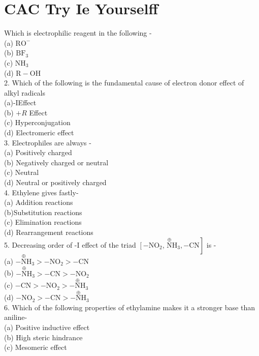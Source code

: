 \documentclass[10pt]{article}
\begin{document}
\section*{CAC Try Ie Yourselff}
Which is electrophilic reagent in the following -\\
(a) $\mathrm{RO}^{-}$\\
(b) $\mathrm{BF}_{3}$\\
(c) $\mathrm{NH}_{3}$\\
(d) $\mathrm{R}-\mathrm{OH}$\\
2. Which of the following is the fundamental cause of electron donor effect of alkyl radicals\\
(a)-IEffect\\
(b) $+R$ Effect\\
(c) Hyperconjugation\\
(d) Electromeric effect\\
3. Electrophiles are always -\\
(a) Positively charged\\
(b) Negatively charged or neutral\\
(c) Neutral\\
(d) Neutral or positively charged\\
4. Ethylene gives fastly-\\
(a) Addition reactions\\
(b)Substitution reactions\\
(c) Elimination reactions\\
(d) Rearrangement reactions\\
5. Decreasing order of -I effect of the triad $\left[-\mathrm{NO}_{2}\right.$, $\left.\stackrel{\oplus}{\mathrm{N}} \mathrm{H}_{3},-\mathrm{CN}\right]$ is -\\
(a) $-\stackrel{\oplus}{\mathrm{N}} \mathrm{H}_{3}>-\mathrm{NO}_{2}>-\mathrm{CN}$\\
(b) $-\stackrel{\oplus}{\mathrm{N}} \mathrm{H}_{3}>-\mathrm{CN}>-\mathrm{NO}_{2}$\\
(c) $-\mathrm{CN}>-\mathrm{NO}_{2}>-\stackrel{\oplus}{\mathrm{N}} \mathrm{H}_{3}$\\
(d) $-\mathrm{NO}_{2}>-\mathrm{CN}>-\stackrel{\oplus}{\mathrm{N}} \mathrm{H}_{3}$\\
6. Which of the following properties of ethylamine makes it a stronger base than aniline-\\
(a) Positive inductive effect\\
(b) High steric hindrance\\
(c) Mesomeric effect\\
\end{document}
